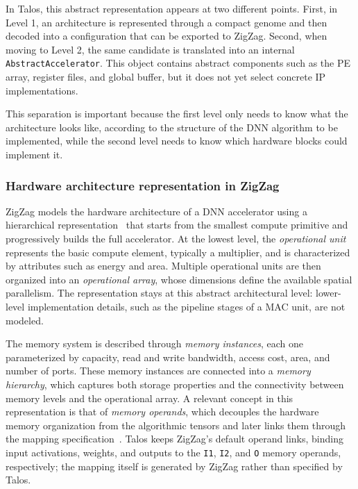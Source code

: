 In Talos, this abstract representation appears at two different
points. First, in Level 1, an architecture is represented through a
compact genome and then decoded into a configuration that can be
exported to ZigZag. Second, when moving to Level 2, the same
candidate is translated into an internal
\texttt{AbstractAccelerator}. This object contains abstract
components such as the PE array, register files, and global buffer,
but it does not yet select concrete IP implementations.

This separation is important because the first level only needs to
know what the architecture looks like, according to the structure of the DNN algorithm to be implemented, while the second level needs
to know which hardware blocks could implement it.

\subsubsection{Hardware architecture representation in ZigZag}

ZigZag models the hardware architecture of a DNN accelerator using a
hierarchical representation~\cite{zigzag_hardware_docs} that starts
from the smallest compute primitive and progressively builds the full
accelerator. At the lowest level, the \textit{operational unit}
represents the basic compute element, typically a multiplier, and is
characterized by attributes such as energy and area. Multiple
operational units are then organized into an \textit{operational
array}, whose dimensions define the available spatial parallelism.
The representation stays at this abstract architectural level:
lower-level implementation details, such as the pipeline stages of a
MAC unit, are not modeled.

The memory system is described through \textit{memory instances},
each one parameterized by capacity, read and write bandwidth, access
cost, area, and number of ports. These memory instances are connected
into a \textit{memory hierarchy}, which captures both storage
properties and the connectivity between memory levels and the
operational array. A relevant concept in this representation is that
of \textit{memory operands}, which decouples the hardware memory
organization from the algorithmic tensors and later links them
through the mapping specification~\cite{zigzag_mapping_docs}. Talos
keeps ZigZag's default operand links, binding input activations,
weights, and outputs to the \texttt{I1}, \texttt{I2}, and \texttt{O}
memory operands, respectively; the mapping itself is generated by
ZigZag rather than specified by Talos.

